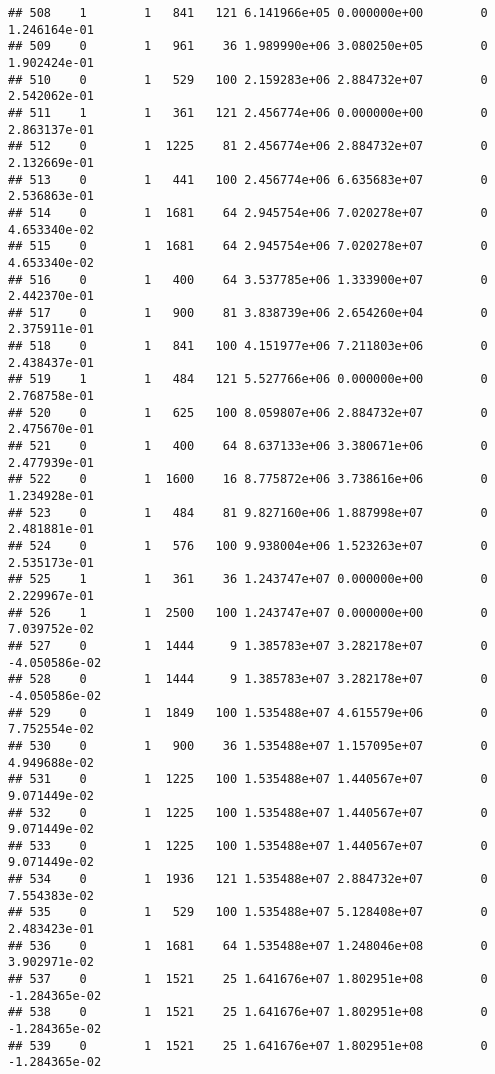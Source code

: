 \documentclass[
]{article}
\begin{document}
\begin{enumerate}
\begin{verbatim}
## 508    1        1   841   121 6.141966e+05 0.000000e+00        0  1.246164e-01
## 509    0        1   961    36 1.989990e+06 3.080250e+05        0  1.902424e-01
## 510    0        1   529   100 2.159283e+06 2.884732e+07        0  2.542062e-01
## 511    1        1   361   121 2.456774e+06 0.000000e+00        0  2.863137e-01
## 512    0        1  1225    81 2.456774e+06 2.884732e+07        0  2.132669e-01
## 513    0        1   441   100 2.456774e+06 6.635683e+07        0  2.536863e-01
## 514    0        1  1681    64 2.945754e+06 7.020278e+07        0  4.653340e-02
## 515    0        1  1681    64 2.945754e+06 7.020278e+07        0  4.653340e-02
## 516    0        1   400    64 3.537785e+06 1.333900e+07        0  2.442370e-01
## 517    0        1   900    81 3.838739e+06 2.654260e+04        0  2.375911e-01
## 518    0        1   841   100 4.151977e+06 7.211803e+06        0  2.438437e-01
## 519    1        1   484   121 5.527766e+06 0.000000e+00        0  2.768758e-01
## 520    0        1   625   100 8.059807e+06 2.884732e+07        0  2.475670e-01
## 521    0        1   400    64 8.637133e+06 3.380671e+06        0  2.477939e-01
## 522    0        1  1600    16 8.775872e+06 3.738616e+06        0  1.234928e-01
## 523    0        1   484    81 9.827160e+06 1.887998e+07        0  2.481881e-01
## 524    0        1   576   100 9.938004e+06 1.523263e+07        0  2.535173e-01
## 525    1        1   361    36 1.243747e+07 0.000000e+00        0  2.229967e-01
## 526    1        1  2500   100 1.243747e+07 0.000000e+00        0  7.039752e-02
## 527    0        1  1444     9 1.385783e+07 3.282178e+07        0 -4.050586e-02
## 528    0        1  1444     9 1.385783e+07 3.282178e+07        0 -4.050586e-02
## 529    0        1  1849   100 1.535488e+07 4.615579e+06        0  7.752554e-02
## 530    0        1   900    36 1.535488e+07 1.157095e+07        0  4.949688e-02
## 531    0        1  1225   100 1.535488e+07 1.440567e+07        0  9.071449e-02
## 532    0        1  1225   100 1.535488e+07 1.440567e+07        0  9.071449e-02
## 533    0        1  1225   100 1.535488e+07 1.440567e+07        0  9.071449e-02
## 534    0        1  1936   121 1.535488e+07 2.884732e+07        0  7.554383e-02
## 535    0        1   529   100 1.535488e+07 5.128408e+07        0  2.483423e-01
## 536    0        1  1681    64 1.535488e+07 1.248046e+08        0  3.902971e-02
## 537    0        1  1521    25 1.641676e+07 1.802951e+08        0 -1.284365e-02
## 538    0        1  1521    25 1.641676e+07 1.802951e+08        0 -1.284365e-02
## 539    0        1  1521    25 1.641676e+07 1.802951e+08        0 -1.284365e-02

\end{verbatim}
\end{enumerate}
\end{document}
